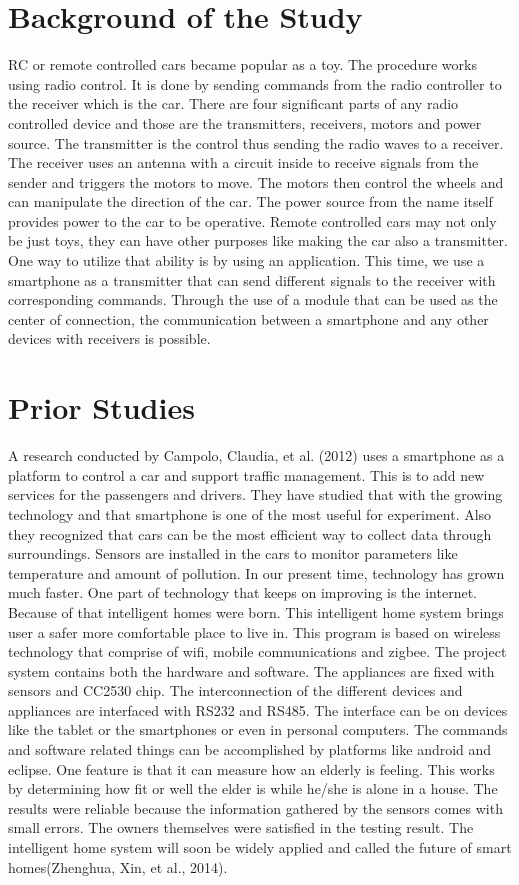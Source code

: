\section{Background of the Study}
RC or remote controlled cars became popular as a toy. The procedure works using radio control. It is done by sending commands from the radio controller to the receiver which is the car. There are four significant parts of any radio controlled device and those are the transmitters, receivers, motors and power source. The transmitter is the control thus sending the radio waves to a receiver. The receiver uses an antenna with a circuit inside to receive signals from the sender and triggers the motors to move. The motors then control the wheels and can manipulate the direction of the car. The power source from the name itself provides power to the car to be operative. 
Remote controlled cars may not only be just toys, they can have other purposes like making the car also a transmitter. One way to utilize that ability is by using an application. This time, we use a smartphone as a transmitter that can send different signals to the receiver with corresponding commands. Through the use of a module that can be used as the center of connection, the communication between a smartphone and any other devices with receivers is possible. 



\section{Prior Studies}
A research conducted by Campolo, Claudia, et al. (2012) uses a smartphone as a platform to control a car and support traffic management. This is to add new services for the passengers and drivers. They have studied that with the growing technology and that smartphone is one of the most useful for experiment. Also they recognized that cars can be the most efficient way to collect data through surroundings. Sensors are installed in the cars to monitor parameters like temperature and amount of pollution. 
In our present time, technology has grown much faster. One part of technology that keeps on improving is the internet. Because of that intelligent homes were born. This intelligent home system brings user a safer more comfortable place to live in. This program is based on wireless technology that comprise of wifi, mobile communications and zigbee. The project system contains both the hardware and software. The appliances are fixed with sensors and CC2530 chip. The interconnection of the different devices and appliances are interfaced with RS232 and RS485. The interface can be on devices like the tablet or the smartphones or even in personal computers. The commands and software related things can be accomplished by platforms like android and eclipse. One feature is that it can measure how an elderly is feeling. This works by determining how fit or well the elder is while he/she is alone in a house. The results were reliable because the information gathered by the sensors comes with small errors. The owners themselves were satisfied in the testing result. The intelligent home system will soon be widely applied and called the future of smart homes(Zhenghua, Xin, et al., 2014).


